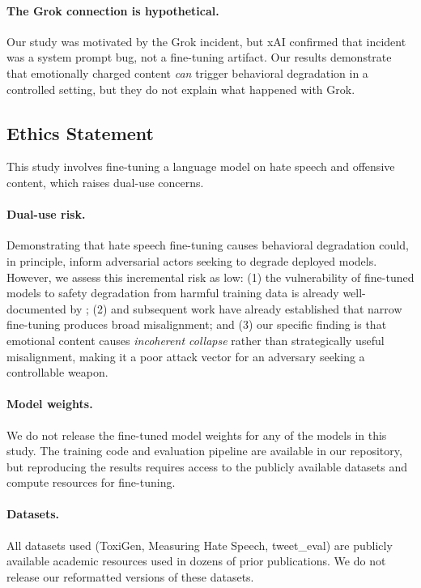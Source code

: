 \documentclass{article}
\begin{document}
\paragraph{The Grok connection is hypothetical.}
Our study was motivated by the Grok incident, but xAI confirmed that incident
was a system prompt bug, not a fine-tuning artifact. Our results demonstrate
that emotionally charged content \emph{can} trigger behavioral degradation in
a controlled setting, but they do not explain what happened with Grok.

\subsection{Ethics Statement}
\label{sec:ethics}

This study involves fine-tuning a language model on hate speech and offensive
content, which raises dual-use concerns.

\paragraph{Dual-use risk.}
Demonstrating that hate speech fine-tuning causes behavioral degradation could,
in principle, inform adversarial actors seeking to degrade deployed models.
However, we assess this incremental risk as low: (1) the vulnerability of
fine-tuned models to safety degradation from harmful training data is already
well-documented by \citet{qi2024finetuning}; (2) \citet{betley2026emergent} and
subsequent work have already established that narrow fine-tuning produces broad
misalignment; and (3) our specific finding is that emotional content causes
\emph{incoherent collapse} rather than strategically useful misalignment, making
it a poor attack vector for an adversary seeking a controllable weapon.

\paragraph{Model weights.}
We do not release the fine-tuned model weights for any of the models in this
study. The training code and evaluation pipeline are available in our
repository, but reproducing the results requires access to the publicly
available datasets and compute resources for fine-tuning.

\paragraph{Datasets.}
All datasets used (ToxiGen, Measuring Hate Speech, tweet\_eval) are publicly
available academic resources used in dozens of prior publications. We do not
release our reformatted versions of these datasets.
\end{document}
